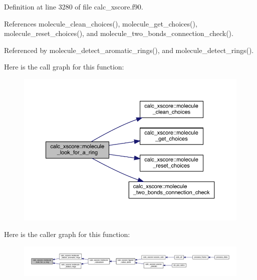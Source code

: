 Definition at line 3280 of file calc\-\_\-xscore.\-f90.



References molecule\-\_\-clean\-\_\-choices(), molecule\-\_\-get\-\_\-choices(), molecule\-\_\-reset\-\_\-choices(), and molecule\-\_\-two\-\_\-bonds\-\_\-connection\-\_\-check().



Referenced by molecule\-\_\-detect\-\_\-aromatic\-\_\-rings(), and molecule\-\_\-detect\-\_\-rings().



Here is the call graph for this function\-:
\nopagebreak
\begin{figure}[H]
\begin{center}
\leavevmode
\includegraphics[width=350pt]{classcalc__xscore_a3fa40f44b00df2a04db56f4be7a39824_cgraph}
\end{center}
\end{figure}




Here is the caller graph for this function\-:
\nopagebreak
\begin{figure}[H]
\begin{center}
\leavevmode
\includegraphics[width=350pt]{classcalc__xscore_a3fa40f44b00df2a04db56f4be7a39824_icgraph}
\end{center}
\end{figure}


